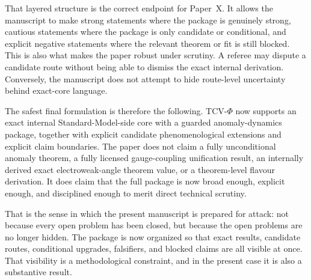 \documentclass[11pt]{article}
\begin{document}
That layered structure is the correct endpoint for Paper~X. It allows the manuscript to make strong statements where the package is genuinely strong, cautious statements where the package is only candidate or conditional, and explicit negative statements where the relevant theorem or fit is still blocked. This is also what makes the paper robust under scrutiny. A referee may dispute a candidate route without being able to dismiss the exact internal derivation. Conversely, the manuscript does not attempt to hide route-level uncertainty behind exact-core language.

The safest final formulation is therefore the following. TCV-$\Phi$ now supports an exact internal Standard-Model-side core with a guarded anomaly-dynamics package, together with explicit candidate phenomenological extensions and explicit claim boundaries. The paper does not claim a fully unconditional anomaly theorem, a fully licensed gauge-coupling unification result, an internally derived exact electroweak-angle theorem value, or a theorem-level flavour derivation. It does claim that the full package is now broad enough, explicit enough, and disciplined enough to merit direct technical scrutiny.

That is the sense in which the present manuscript is prepared for attack: not because every open problem has been closed, but because the open problems are no longer hidden. The package is now organized so that exact results, candidate routes, conditional upgrades, falsifiers, and blocked claims are all visible at once. That visibility is a methodological constraint, and in the present case it is also a substantive result.
\end{document}
